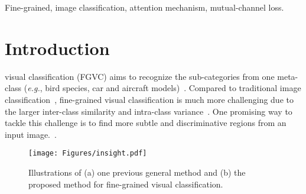 \documentclass[journal]{IEEEtran}
\begin{document}
\begin{IEEEkeywords}
Fine-grained, image classification, attention mechanism, mutual-channel loss.
\end{IEEEkeywords}







%
\IEEEpeerreviewmaketitle





\section{Introduction}

 visual classification (FGVC) aims to recognize the sub-categories from one meta-class (\emph{e.g.}, bird species, car and aircraft models)~\cite{lin2015bilinear}. Compared to traditional image classification~\cite{luo2017convolutional,lei2019semi,li2020discriminative,cong2019going,lei2020deep}, fine-grained visual classification is much more challenging due to the larger inter-class similarity and intra-class variance~\cite{ding2019selective,fu2017look}.
One promising way to tackle this challenge is to find more subtle and discriminative regions from an input image.~\cite{wang2018learning, yang2018learning,luo2019cross,zheng2020iu}.


 

\begin{figure}[!t]
\begin{center}
  \texttt{[image: Figures/insight.pdf]}
\end{center}
  \caption{Illustrations of (a) one previous general method and (b) the proposed method for fine-grained visual classification.} 

\label{fig:insight}
\end{figure}
\end{document}
